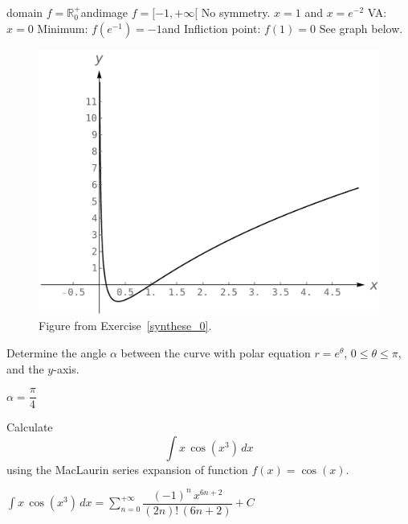 \begin{Answer}

\Question domain $f = \mathbb{R}_0^+$\qquad and\qquad image $f = [-1,+\infty[$
\Question No symmetry.
\Question $x=1$ and $x=e^{-2}$
\Question VA: $x=0$
\Question Minimum: $f(e^{-1})=-1$\qquad and \qquad Infliction point: $f(1)=0$
\Question See graph below. 
\begin{figure}[H]
    \centerline{
   \includegraphics[scale=0.5]{fig_synthese_0}
    }
    \caption{Figure from Exercise~\ref{synthese_0}.}
    \end{figure}
    
\end{Answer}



\begin{Exercise} Determine the angle $\alpha$ between the curve with polar equation $r=e^\theta$, $0\leq\theta\leq\pi$, and the $y$-axis. 
\end{Exercise}

\begin{Answer}
$\alpha = \dfrac{\pi}{4}$    
\end{Answer}


\begin{Exercise} Calculate
$$
\displaystyle\int x\,\cos\left(x^3\right)\,dx
$$
using the MacLaurin series expansion of function $f(x)=\cos(x)$. 
\end{Exercise}

\begin{Answer}
 $
\displaystyle\int x\,\cos\left(x^3\right)\,dx = \sum_{n=0}^{+\infty} \dfrac{(-1)^n\, x^{6n+2}}{(2n)!\, (6n+2)} + C
$   
\end{Answer}



